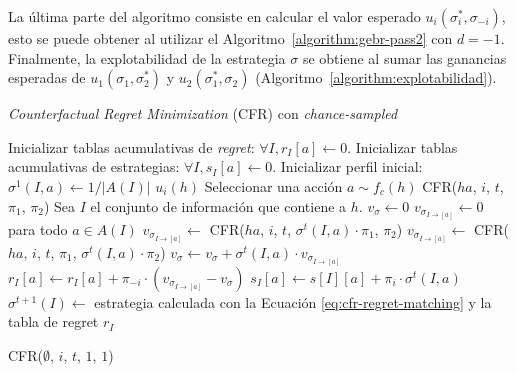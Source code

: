 La última parte del algoritmo consiste en calcular el valor esperado $u_i(\sigma^*_i, \sigma_{-i})$, esto se puede obtener al utilizar el Algoritmo~\ref{algorithm:gebr-pass2} con $d = -1$. Finalmente, la explotabilidad de la estrategia $\sigma$ se obtiene al sumar las ganancias esperadas de $u_1(\sigma_1, \sigma^*_2)$ y $u_2(\sigma^*_1, \sigma_2)$ (Algoritmo~\ref{algorithm:explotabilidad}).

\begin{algorithm}
\caption{\textit{Counterfactual Regret Minimization} (CFR) con \textit{chance-sampled}}
\label{algorithm:CFR}
\begin{algorithmic}[1]
    \State Inicializar tablas acumulativas de \textit{regret}: $\forall I, r_I[a] \leftarrow 0$.
    \State Inicializar tablas acumulativas de estrategias: $\forall I, s_I[a] \leftarrow 0$.
    \State Inicializar perfil inicial: $\sigma^1(I, a) \leftarrow 1/|A(I)|$ \label{x}
    \State
            \State \Return $u_i(h)$
            \State Seleccionar una acción $a \sim f_c(h)$
            \State \Return CFR($ha$, $i$, $t$, $\pi_1$, $\pi_2$)
        \EndIf
        \State Sea $I$ el conjunto de información que contiene a $h$.
        \State $v_{\sigma} \leftarrow 0$
        \State $v_{\sigma_{I \rightarrow [a]}} \leftarrow 0 $ para todo $a \in A(I)$
                \State $v_{\sigma_{I \rightarrow [a]}} \leftarrow$ CFR($ha$, $i$, $t$, $\sigma^t(I, a) \cdot \pi_1$, $\pi_2$)
                \State $v_{\sigma_{I \rightarrow [a]}} \leftarrow$ CFR($ha$, $i$, $t$, $\pi_1$, $\sigma^t(I, a) \cdot \pi_2$)
            \EndIf
            \State $v_{\sigma} \leftarrow v_{\sigma} + \sigma^t(I, a) \cdot v_{\sigma_{I \rightarrow [a]}}$
        \EndFor
                \State $r_I[a] \leftarrow r_I[a] + \pi_{-i} \cdot (v_{\sigma_{I \rightarrow [a]}} - v_{\sigma})$
                \State $s_{I}[a] \leftarrow s[I][a] + \pi_i \cdot \sigma^t(I, a)$
            \EndFor
            \State $\sigma^{t+1}(I) \leftarrow $ estrategia calculada con la Ecuación \ref{eq:cfr-regret-matching} y la tabla de regret $r_I$  
        \EndIf
    \EndFunction
    \State

                \State CFR($\emptyset$, $i$, $t$, $1$, $1$)
            \EndFor
        \EndFor
    \EndFunction
\end{algorithmic}
\end{algorithm}


